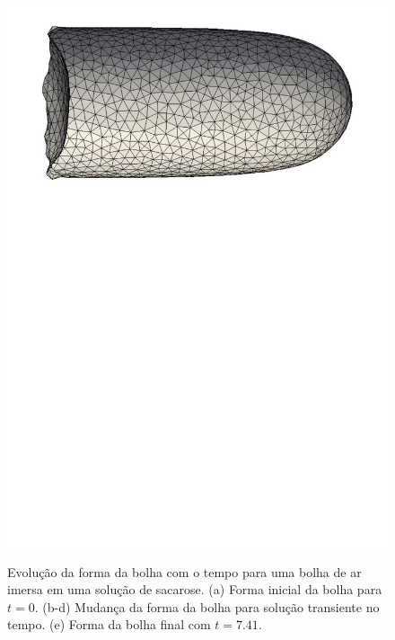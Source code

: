 \documentclass[a4paper,portuges,12pt]{article}
\begin{document}
\begin{figure}[!h]
\begin{center}
			{\includegraphics[angle=90,scale=0.29]{figs/sucrose-5.pdf}}
 	\end{center}
	\caption{Evolução da forma da bolha com o tempo para uma bolha de ar
	imersa em uma solução de sacarose. (a) Forma inicial da bolha para
	$t=0$. (b-d) Mudança da forma da bolha para solução transiente no
	tempo. (e) Forma da bolha final com $t=7.41$.} 
	\label{fig:sucrose} 
 \end{figure}
\end{document}
